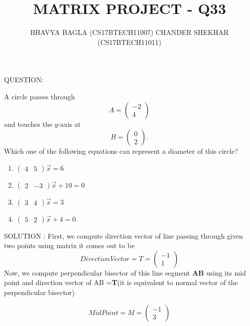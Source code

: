 \documentclass{beamer}
\title{MATRIX PROJECT - Q33}
\author{BHAVYA BAGLA (CS17BTECH11007) \newline CHANDER SHEKHAR (CS17BTECH11011) }
\newcommand{\myvec}[1]{\ensuremath{\begin{pmatrix}#1\end{pmatrix}}}
\begin{document}
\maketitle
\begin{frame}{QUESTION:}
\item A circle passes through 
\begin{equation}
A =\myvec{-2\\ 4} 
\end{equation} 
and touches the $y$-axis at 
\begin{equation} 
B =\myvec{0\\ 2}. 
\end{equation}
Which one of the  following equations can represent a diameter of this circle?
\begin{enumerate} 
\item $\myvec{4 & 5}\vec{x} = 6 $
\item $\myvec{2 & -3}\vec{x} +10 = 0 $
\item $\myvec{3 & 4}\vec{x} = 3 $
\item $\myvec{5 & 2}\vec{x} +4= 0 $
\end{enumerate} 


\end{frame}
\begin{frame}{SOLUTION :}
First, we compute direction vector of line passing through given two points using matrix it comes out to be 
\newline 
\begin{equation}
    Direction Vector = T = \myvec{-1\\1}
\end{equation}
\newline
Now, we compute perpendicular bisector of this line segment \textbf{AB} using its mid point and direction vector of AB =\textbf{T}(it is equivalent to normal vector of the perpendicular bisector)  \newline



\begin{equation}
    Mid Point = M = \myvec{-1\\3}
\end{equation}
\end{frame}
\end{document}
